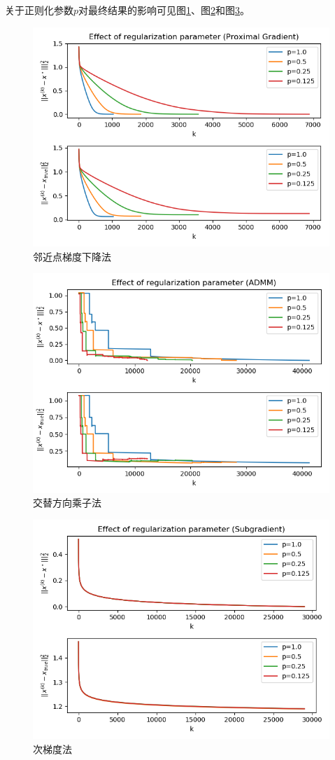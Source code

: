 \documentclass[logo,reportComp]{thesis}
\begin{document}
关于正则化参数$p$对最终结果的影响可见图\ref{fig:pprox}、图\ref{fig:padmm}和图\ref{fig:psubgrad}。
\begin{figure}[H]
\centering
\includegraphics[width=0.8\linewidth]{fig/pprox.png}
\caption{邻近点梯度下降法}
\label{fig:pprox}
\end{figure}
\begin{figure}[H]
\centering
\includegraphics[width=0.8\linewidth]{fig/padmm.png}
\caption{交替方向乘子法}
\label{fig:padmm}
\end{figure}
\begin{figure}[H]
\centering
\includegraphics[width=0.8\linewidth]{fig/psubgrad.png}
\caption{次梯度法}
\label{fig:psubgrad}
\end{figure}
\end{document}
